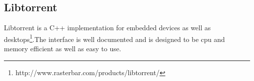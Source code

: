 \subsection{Libtorrent}
Libtorrent is a C++ implementation for embedded devices as well as desktops\footnote{http://www.rasterbar.com/products/libtorrent/}.The interface is well documented and is designed to be cpu and memory efficient as well as easy to use. 